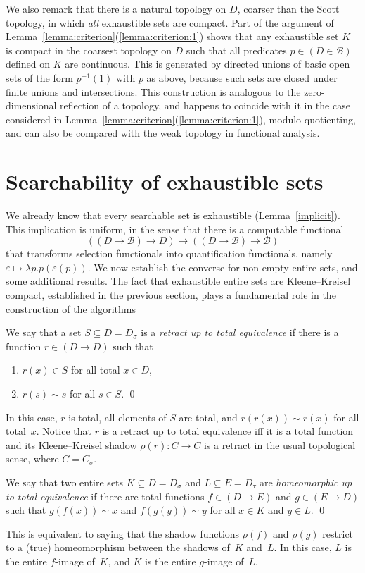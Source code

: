 \documentclass{LMCS}
\newcommand{\e}{\varepsilon}
\newcommand{\pBool}{\mathcal{B}}
\newcommand{\True}{1}\newcommand{\False}{0}\newcommand{\domain}[1]{{\D_{#1}}}
\newcommand{\D}{D}
\begin{document}
We also remark that there is a natural topology on $D$, coarser than
the Scott topology, in which \emph{all} exhaustible sets are compact.
Part of the argument of
Lemma~\ref{lemma:criterion}(\ref{lemma:criterion:1}) shows that any
exhaustible set $K$ is compact in the coarsest topology on $D$ such
that all predicates $p \in (D \in \pBool)$ defined on $K$ are
continuous.  This is generated by directed unions of basic open sets
of the form $p^{-1}(\True)$ with $p$ as above, because such sets are
closed under finite unions and intersections.  This construction is
analogous to the zero-dimensional reflection of a topology, and
happens to coincide with it in the case considered in
Lemma~\ref{lemma:criterion}(\ref{lemma:criterion:1}), modulo
quotienting, and can also be compared with the weak topology in
functional analysis.


\section{Searchability  of exhaustible sets} 
\label{characterization}

We already know that every searchable set is exhaustible
(Lemma~\ref{implicit}).  This implication is uniform, in the sense
that there is a computable functional \[ ((\D \to \pBool) \to D) \to
((\D \to \pBool) \to \pBool)\] that transforms selection functionals
into quantification functionals, namely $\e \mapsto \lambda
p.p(\e(p))$. We now establish the converse for non-empty
entire sets, and some additional results. The fact that exhaustible
entire sets are Kleene--Kreisel compact, established in the previous
section, plays a fundamental role in the construction of the
algorithms
\begin{defi} \label{total:retract} We say that a set $S
  \subseteq \D = \D_{\sigma}$ is a \emph{retract up to total
    equivalence} if there is a function $r \in (D \to D)$ such that
\begin{enumerate}
\item $r(x) \in S$ for all total $x \in \D$,
\item $r(s) \sim s$ for all $s \in S$. \qed
\end{enumerate}
\end{defi}
In this case, $r$ is total, all elements of $S$ are total, and
$r(r(x)) \sim r(x)$ for all total~$x$. Notice that $r$ is
a retract up to total equivalence iff it is a total function and its
Kleene--Kreisel shadow $\rho(r) \colon C \to C$ is a retract in the
usual topological sense, where $C=C_{\sigma}$.
\begin{defi}
  We say that two entire sets $K \subseteq D = D_\sigma$ and $L
  \subseteq E = D_\tau$ are \emph{homeomorphic up to total
    equivalence} if there are total functions $f \in (D \to E)$ and $g
  \in (E \to D)$ such that $g(f(x)) \sim x$ and $f(g(y)) \sim y$ for
  all $x \in K$ and $y \in L$. \qed
\end{defi}
This is equivalent to saying that the shadow functions $\rho(f)$ and
$\rho(g)$ restrict to a (true) homeomorphism between the shadows
of~$K$ and~$L$. In this case, $L$ is the entire $f$-image of~$K$, and
$K$ is the entire $g$-image of~$L$.
\end{document}
